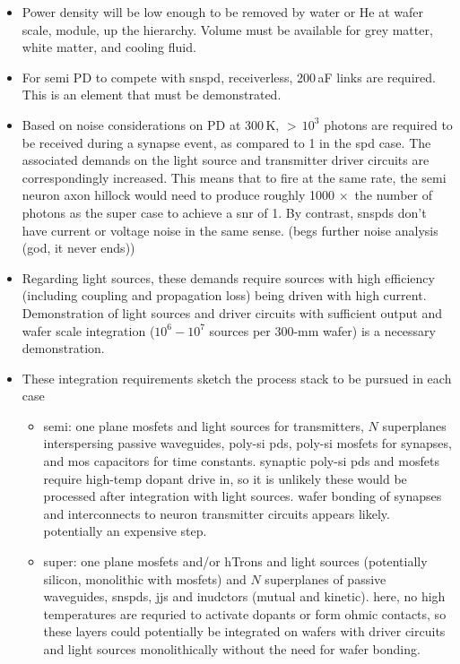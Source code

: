 \documentclass[onecolumn]{article}
\begin{document}
\begin{itemize}
\item Power density will be low enough to be removed by water or He at wafer scale, module, up the hierarchy. Volume must be available for grey matter, white matter, and cooling fluid.

\item For semi PD to compete with snspd, receiverless, 200\,aF links are required. This is an element that must be demonstrated.

\item Based on noise considerations on PD at 300\,K, $>\,10^3$ photons are required to be received during a synapse event, as compared to 1 in the spd case. The associated demands on the light source and transmitter driver circuits are correspondingly increased. This means that to fire at the same rate, the semi neuron axon hillock would need to produce roughly 1000$\,\times$ the number of photons as the super case to achieve a snr of 1. By contrast, snspds don't have current or voltage noise in the same sense. (begs further noise analysis (god, it never ends))

\item Regarding light sources, these demands require sources with high efficiency (including coupling and propagation loss) being driven with high current. Demonstration of light sources and driver circuits with sufficient output and wafer scale integration ($10^6 - 10^7$ sources per 300-mm wafer) is a necessary demonstration.

\item These integration requirements sketch the process stack to be pursued in each case
\begin{itemize}
\item semi: one plane mosfets and light sources for transmitters, $N$ superplanes interspersing passive waveguides, poly-si pds, poly-si mosfets for synapses, and mos capacitors for time constants. synaptic  poly-si pds and mosfets require high-temp dopant drive in, so it is unlikely these would be processed after integration with light sources. wafer bonding of synapses and interconnects to neuron transmitter circuits appears likely. potentially an expensive step.
\item super: one plane mosfets and/or hTrons and light sources (potentially silicon, monolithic with mosfets) and $N$ superplanes of passive waveguides, snspds, jjs and inudctors (mutual and kinetic). here, no high temperatures are requried to activate dopants or form ohmic contacts, so these layers could potentially be integrated on wafers with driver circuits and light sources monolithically without the need for wafer bonding. 
\end{itemize}


\end{itemize}
\end{document}
